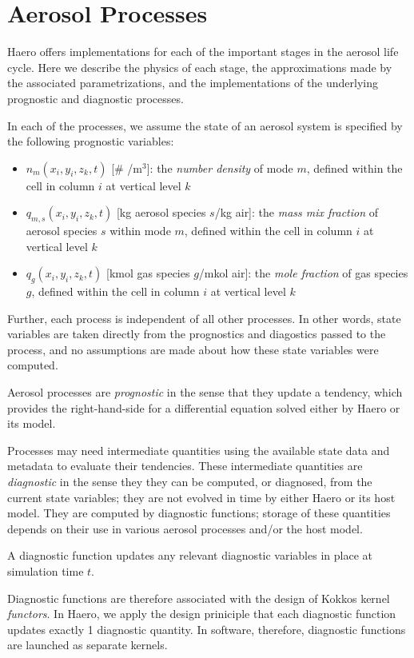 \chapter{Aerosol Processes}

Haero offers implementations for each of the important stages in the aerosol
life cycle. Here we describe the physics of each stage, the approximations
made by the associated parametrizations, and the implementations of the
underlying prognostic and diagnostic processes.

In each of the processes, we assume the state of an aerosol system is specified
by the following prognostic variables:

\begin{itemize}
  \item $ n_m(x_i, y_i, z_k, t)$ [\# /m$^3$]: the {\em number density} of mode $m$,
        defined within the cell in column $i$ at vertical level $k$
  \item $ q_{m,s}(x_i, y_i, z_k, t)$ [kg aerosol species $s$/kg air]: the
        {\em mass mix fraction} of aerosol species $s$ within mode $m$, defined
        within the cell in column $i$ at vertical level $k$
  \item $ q_g(x_i, y_i, z_k, t)$ [kmol gas species $g$/mkol air]: the {\em mole
        fraction} of gas species $g$, defined within the cell in column $i$ at
        vertical level $k$
\end{itemize}

Further, each process is independent of all other processes. In other words,
state variables are taken directly from the prognostics and diagostics passed
to the process, and no assumptions are made about how these state variables
were computed.

\begin{defn}
  Aerosol processes are \emph{prognostic} in the sense that they update a tendency, which provides the right-hand-side for a differential equation solved either by Haero or its model.
\end{defn}


  Processes may need intermediate quantities using the available state data and metadata to evaluate their tendencies.  
  These intermediate quantities are \emph{diagnostic} in the sense they they can be computed, or diagnosed, from the current state variables; they are not evolved in time by either Haero or its host model.
  They are computed by diagnostic functions; storage of these quantities depends on their use in various aerosol processes and/or the host model.
\begin{defn}
  A diagnostic function updates any relevant diagnostic variables in place at simulation time $t$.
  
  Diagnostic functions are therefore associated with the design of Kokkos kernel \emph{functors}.
  In Haero, we apply the design priniciple that each diagnostic function updates exactly 1 diagnostic quantity.
  In software, therefore, diagnostic functions are launched as separate kernels.
\end{defn}

